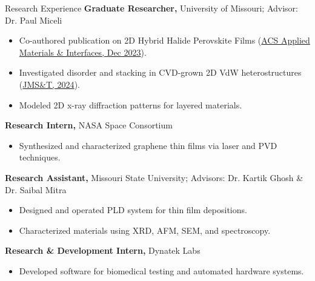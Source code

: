 \begin{rubric}{Research Experience}
    \entry*[2021 -- Present]%
        \textbf{Graduate Researcher,} University of Missouri; Advisor: Dr. Paul Miceli
        \begin{itemize}
            \item Co-authored publication on 2D Hybrid Halide Perovskite Films (\href{https://doi.org/10.1021/acsami.3c14559}{ACS Applied Materials \& Interfaces, Dec 2023}).
            \item Investigated disorder and stacking in CVD-grown 2D VdW heterostructures (\href{https://doi.org/10.1016/j.jmst.2024.01.045}{JMS\&T, 2024}).
            \item Modeled 2D x-ray diffraction patterns for layered materials.
        \end{itemize}
    
    \entry*[2019 -- 2020]%
        \textbf{Research Intern,} NASA Space Consortium
        \begin{itemize}
            \item Synthesized and characterized graphene thin films via laser and PVD techniques.
        \end{itemize}
    
    \entry*[2017 -- 2020]%
        \textbf{Research Assistant,} Missouri State University; Advisors: Dr. Kartik Ghosh \& Dr. Saibal Mitra
        \begin{itemize}
            \item Designed and operated PLD system for thin film depositions.
            \item Characterized materials using XRD, AFM, SEM, and spectroscopy.
        \end{itemize}
    
    \entry*[2019]%
        \textbf{Research \& Development Intern,} Dynatek Labs
        \begin{itemize}
            \item Developed software for biomedical testing and automated hardware systems.
        \end{itemize}
\end{rubric}
